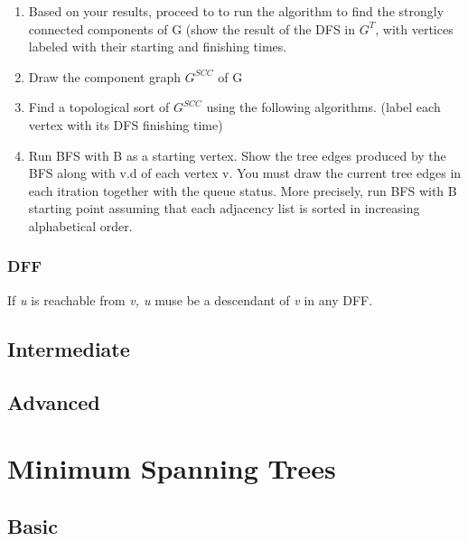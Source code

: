 \documentclass[11pt,fleqn]{book}
\begin{document}
\begin{enumerate}[label=(\alph*)]
   \item Based on your results, proceed to to run the algorithm to find the strongly connected components of G (show the result of the DFS in $G^T$, with vertices labeled with their starting and finishing times. 
   \item Draw the component graph $G^{SCC}$ of G
   \item Find a topological sort of $G^{SCC}$ using the following algorithms. (label each vertex with its DFS finishing time)
   \item Run BFS with B as a starting vertex. Show the tree edges produced by the BFS along with v.d of each vertex v. You must draw the current tree edges in each itration together with the queue status. More precisely, run BFS with B starting point assuming that each adjacency list is sorted in increasing alphabetical order. 
\end{enumerate}
\subsection{DFF }
\begin{example}
If \textit{u} is reachable from \textit{v, u} muse be a descendant of \textit{v} in any DFF. 
\end{example}
\section{Intermediate}
\section{Advanced} 
\chapter{Minimum Spanning Trees}
\section{Basic}
\end{document}

